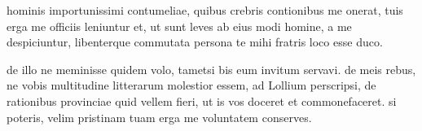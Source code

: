 


 hominis importunissimi contumeliae, quibus crebris contionibus me onerat, tuis erga me officiis leniuntur et, ut sunt leves ab eius modi homine, a me despiciuntur, libenterque commutata persona te mihi fratris loco esse duco.

 de illo ne meminisse quidem volo, tametsi bis eum invitum servavi. de meis rebus, ne vobis multitudine litterarum molestior essem, ad Lollium perscripsi, de rationibus provinciae quid vellem fieri, ut is vos doceret et commonefaceret. si poteris, velim pristinam tuam erga me voluntatem conserves.
